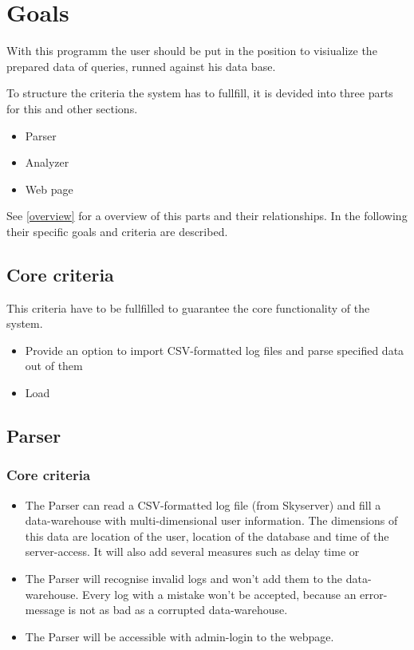 \section{Goals}


With this programm the user should be put in the position 
to visiualize the prepared data of queries, runned against his data base.


To structure the criteria the system has to fullfill, 
it is devided into three parts for this and other sections.
\begin{itemize}
  \item Parser
  \item Analyzer
  \item Web page
\end{itemize}
See \ref{overview} for a overview of this parts and their relationships.
In the following their specific goals and criteria are described.


\subsection{Core criteria}
This criteria have to be fullfilled to guarantee 
the core functionality of the system.

\begin{itemize}
  \item Provide an option to import CSV-formatted log files %
   and parse specified data out of them
  \item Load 
\end{itemize}





\subsection{Parser}

\subsubsection{Core criteria} %
\begin{itemize}
\item The Parser can read a CSV-formatted log file (from Skyserver)
 and fill a data-warehouse with multi-dimensional user information.
 The dimensions of this data are location of the user, location of the 
 database and time of the server-access. It will also add several measures such as delay time or  
\item The Parser will recognise invalid logs and won't add them to the data-warehouse.
 Every log with a mistake won't be accepted, because an error-message is not 
 as bad as a corrupted data-warehouse. 
\item The Parser will be accessible with admin-login to the webpage.
\end{itemize} 

